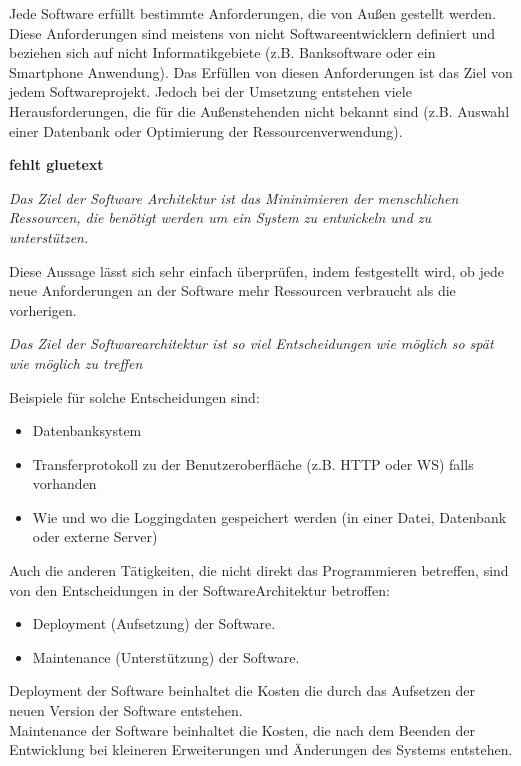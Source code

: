 Jede Software erfüllt bestimmte Anforderungen, die von Außen gestellt werden. 
Diese Anforderungen sind meistens von nicht Softwareentwicklern definiert und beziehen sich auf nicht Informatikgebiete 
    (z.B. Banksoftware oder ein Smartphone Anwendung). 
    Das Erfüllen von diesen Anforderungen ist das Ziel von jedem Softwareprojekt.
    Jedoch bei der Umsetzung entstehen viele Herausforderungen, die für die Außenstehenden nicht bekannt sind 
    (z.B. Auswahl einer Datenbank oder Optimierung der Ressourcenverwendung). 

    \textbf{fehlt gluetext}

    \textit{Das Ziel der Software Architektur ist das Mininimieren der menschlichen Ressourcen, 
    die benötigt werden um ein System zu entwickeln und zu unterstützen.}\cite[5]{cleanArchitecture}

    Diese Aussage lässt sich sehr einfach überprüfen, indem festgestellt wird, 
    ob jede neue Anforderungen an der Software mehr Ressourcen verbraucht als die vorherigen.

    \textit{Das Ziel der Softwarearchitektur ist so viel Entscheidungen wie möglich so spät wie möglich zu treffen}
    \cite[136]{cleanArchitecture}

    Beispiele für solche Entscheidungen sind:
    \begin{itemize}
        \item Datenbanksystem
        \item Transferprotokoll zu der Benutzeroberfläche (z.B. HTTP oder WS) falls vorhanden
        \item Wie und wo die Loggingdaten gespeichert werden (in einer Datei, Datenbank oder externe Server)
    \end{itemize}

    Auch die anderen Tätigkeiten, die nicht direkt das Programmieren betreffen, sind von den Entscheidungen in der SoftwareArchitektur betroffen:
    \begin{itemize}
        \item Deployment (Aufsetzung) der Software.
        \item Maintenance (Unterstützung) der Software.
    \end{itemize}

    Deployment der Software beinhaltet die Kosten die durch das Aufsetzen der neuen Version der Software entstehen.\\
    Maintenance der Software beinhaltet die Kosten, die nach dem Beenden der Entwicklung bei kleineren Erweiterungen und Änderungen des Systems entstehen.

